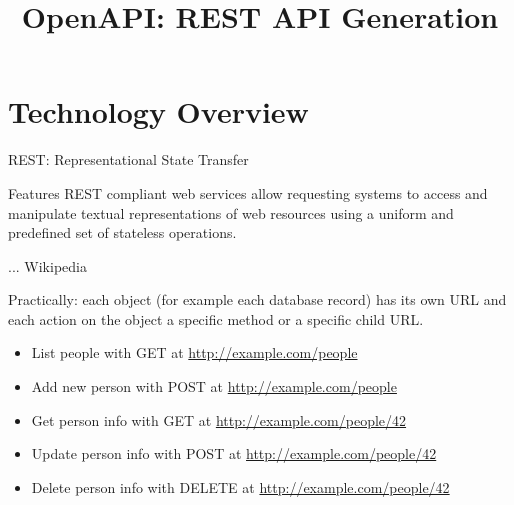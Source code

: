\RequirePackage{slides-shared}
\title{OpenAPI: REST API Generation}



\makepreamble


\section{Technology Overview}

\begin{frame}{REST: Representational State Transfer}
    \begin{block}{Features}
        REST compliant web services allow requesting systems to access
        and manipulate textual representations of web resources using
        a uniform and predefined set of stateless operations.

        \hfill ... Wikipedia
    \end{block}

    \bigskip

    Practically: each object (for example each database record) has its own URL
    and each action on the object a specific method or a specific child URL.

    \medskip

    \begin{itemize}
        \item List people with GET at \url{http://example.com/people}
        \item Add new person with POST at \url{http://example.com/people}
        \item Get person info with GET at \url{http://example.com/people/42}
        \item Update person info with POST at \url{http://example.com/people/42}
        \item Delete person info with DELETE at \url{http://example.com/people/42}
    \end{itemize}

\end{frame}


